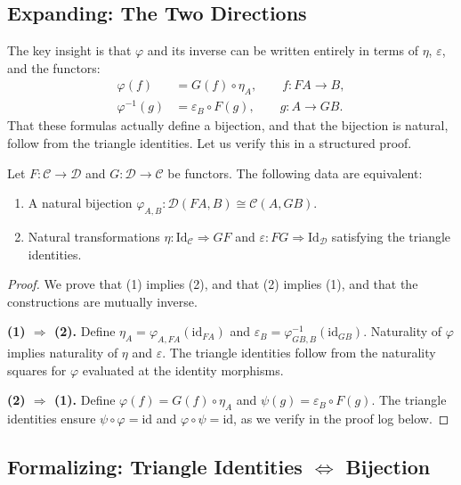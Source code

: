 \subsection{Expanding: The Two Directions}

The key insight is that $\varphi$ and its inverse can be written entirely in
terms of $\eta$, $\varepsilon$, and the functors:
\begin{align*}
  \varphi(f) &= G(f) \circ \eta_A, \qquad f : FA \to B, \\
  \varphi^{-1}(g) &= \varepsilon_B \circ F(g), \qquad g : A \to GB.
\end{align*}
That these formulas actually define a bijection, and that the bijection is
natural, follow from the triangle identities. Let us verify this in a
structured proof.

\begin{theorem}
\label{thm:triangle-bijection}
Let $F : \mathcal{C} \to \mathcal{D}$ and $G : \mathcal{D} \to \mathcal{C}$
be functors. The following data are equivalent:
\begin{enumerate}
  \item A natural bijection $\varphi_{A,B} : \mathcal{D}(FA, B) \cong \mathcal{C}(A, GB)$.
  \item Natural transformations $\eta : \mathrm{Id}_\mathcal{C} \Rightarrow GF$
        and $\varepsilon : FG \Rightarrow \mathrm{Id}_\mathcal{D}$ satisfying
        the triangle identities.
\end{enumerate}
\end{theorem}

\begin{proof}
We prove that (1) implies (2), and that (2) implies (1), and that the
constructions are mutually inverse.

\textbf{(1) $\Rightarrow$ (2).} Define $\eta_A = \varphi_{A,FA}(\mathrm{id}_{FA})$
and $\varepsilon_B = \varphi^{-1}_{GB,B}(\mathrm{id}_{GB})$. Naturality of
$\varphi$ implies naturality of $\eta$ and $\varepsilon$. The triangle
identities follow from the naturality squares for $\varphi$ evaluated at the
identity morphisms.

\textbf{(2) $\Rightarrow$ (1).} Define $\varphi(f) = G(f) \circ \eta_A$ and
$\psi(g) = \varepsilon_B \circ F(g)$. The triangle identities ensure $\psi
\circ \varphi = \mathrm{id}$ and $\varphi \circ \psi = \mathrm{id}$, as we
verify in the proof log below.
\end{proof}

\subsection{Formalizing: Triangle Identities $\Leftrightarrow$ Bijection}

